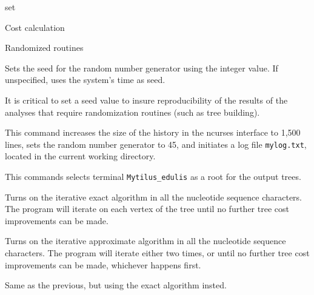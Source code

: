 \begin{command}{set}{}
\begin{arguments}
\begin{argumentgroup}{Cost calculation}
\begin{statement}
  \end{statement}
	
        \end{argumentgroup}

        \begin{argumentgroup}{Randomized routines}
            {}

                {Sets the seed for the random number generator using the integer 
                value. If unspecified, \poy uses the system's time as seed.}
                {}
	\begin{statement}
  	 It is critical to set a seed value to insure reproducibility of the results
	 of the analyses that require randomization routines (such as tree
	 building).
	\end{statement}
	
            \end{argumentgroup}
	\end{arguments}


    \begin{poyexamples}
            {This command increases the size of the history in the ncurses
            interface to 1,500 lines, sets the random number generator to 45,
            and initiates a log file \texttt{mylog.txt}, located in the current
            working directory.}
            
            {This commands selects terminal \texttt{Mytilus\_edulis} as a root
            for the output trees.}
            
            {Turns on the iterative exact algorithm in all the nucleotide
            sequence characters. The program will iterate on each vertex of the
            tree until no further tree cost improvements can be made.}

            {Turns on the iterative approximate algorithm in all the nucleotide
            sequence characters. The program will iterate either two times, or
            until no further tree cost improvements can be made, whichever
            happens first.}

            {Same as the previous, but using the exact algorithm insted.}
     \end{poyexamples}
     
	\begin{poyalso}
	\end{poyalso}

\end{command}

